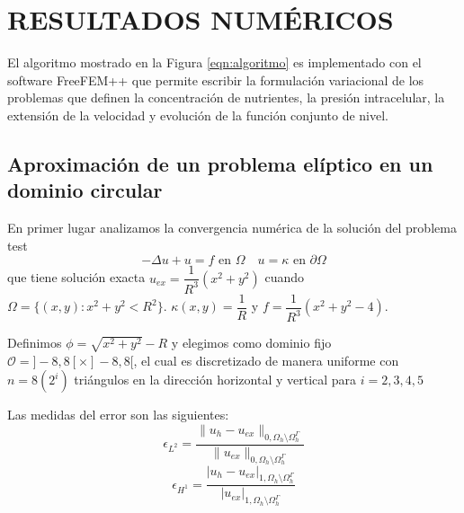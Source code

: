 \chapter{\MakeUppercase{Resultados numéricos}}
\thispagestyle{fancy}
El algoritmo  mostrado en la Figura \ref{eqn:algoritmo}   es implementado con el software FreeFEM++  \cite{MR3043640} que permite escribir la formulación variacional de los problemas que definen la concentración de nutrientes, la presión intracelular, la extensión de la velocidad y evolución de la función conjunto de nivel.
\section{Aproximación de un problema elíptico en un dominio circular}
En primer lugar analizamos la convergencia numérica de la solución del problema test
\begin{equation}
	-\Delta u+ u =f \text{ en } \Omega\quad
	u=\kappa \text{ en } \partial \Omega
	\label{eqn:problematest1}
\end{equation}
que tiene solución exacta $u_{ex}=\dfrac{1}{R^3}(x^2+y^2)$ cuando $\Omega=\{(x,y):x^2+y^2<R^2\}$. $\kappa(x,y)=\dfrac{1}{R}$ y $f = \dfrac{1}{R^3}(x^2+y^2-4)$.

Definimos $\phi=\sqrt{x^2+y^2}-R$ y elegimos como dominio fijo $\mathcal{O}=]-8,8[\times ]-8,8[$, el cual es discretizado de manera uniforme con $n=8(2^i)$ triángulos en la dirección horizontal y vertical para $i=2,3,4,5$

Las medidas del error son las siguientes: 
\[
\epsilon_{L^2}=\dfrac{\|u_h-u_{ex}\|_{0,\Omega_h\setminus\Omega_h^\Gamma}}{\|u_{ex}\|_{0,\Omega_h\setminus\Omega_h^\Gamma}}
\]
\[
\epsilon_{H^1}=\dfrac{|u_h-u_{ex}|_{1,\Omega_h\setminus\Omega_h^\Gamma}}{|u_{ex}|_{1,\Omega_h\setminus\Omega_h^\Gamma}}
\]

